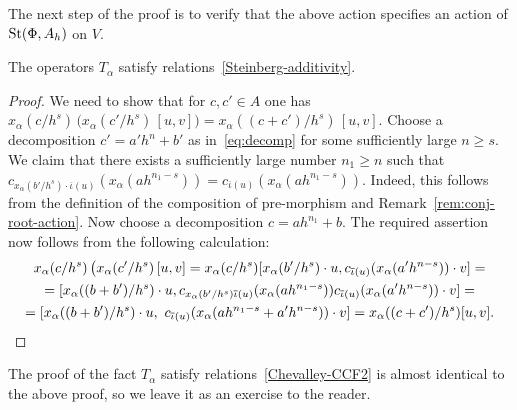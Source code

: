 \documentclass[oneside, 11pt]{amsart} \pdfoutput=1
\begin{document}
The next step of the proof is to verify that the above action specifies an action of $\mathop{\mathrm{St}}\nolimits(\Phi, A_h)$ on $V$.

\begin{lemma} The operators $T_\alpha$ satisfy relations~\eqref{Steinberg-additivity}. \end{lemma}
\begin{proof}
We need to show that for $c, c' \in A$ one has $\textstyle
x_\alpha(c/{h^s})\, \bigl(x_\alpha(c'/h^s)\, [u, v]\bigr) = x_\alpha((c+c')/h^s)\, [u, v].$
Choose a decomposition $c' = a'h^n + b'$ as in~\eqref{eq:decomp} for some sufficiently large $n \geq s$.
We claim that there exists a sufficiently large number $n_1 \geq n$ such that $c_{x_\alpha(b'/h^s) \cdot \overline{\iota}(u)}(x_\alpha(ah^{n_1-s})) = c_{\overline{\iota}(u)}(x_\alpha(ah^{n_1-s}))$. Indeed, this follows from the definition of the composition of pre-morphism and Remark~\ref{rem:conj-root-action}. 
Now choose a decomposition $c = a h^{n_1} + b$.
The required assertion now follows from the following calculation:
\begin{multline*}
 x_\alpha(c/{h^s})\, \bigl(x_\alpha(c'/h^s)\, [u, v] = x_\alpha(c/h^s)[x_\alpha(b'/h^s)\cdot u, c_{\overline{\iota}(u)}(x_\alpha(a'h^{n-s})) \cdot v] = \\
 = [x_\alpha((b + b')/h^s)\cdot u, c_{x_\alpha(b'/h^s)\overline{\iota}(u)}(x_\alpha(ah^{n_1-s})) c_{\overline{\iota}(u)}(x_\alpha(a'h^{n-s})) \cdot v] = \\ = [x_\alpha((b + b')/h^s)\cdot u,\  c_{\overline{\iota}(u)}(x_\alpha(ah^{n_1-s} + a'h^{n-s})) \cdot v] = x_\alpha((c+c')/h^s)[u, v]. \qedhere
\end{multline*}
\end{proof}

The proof of the fact $T_\alpha$ satisfy relations~\eqref{Chevalley-CCF2} is almost identical to the above proof, so we leave it as an exercise to the reader. %
\end{document}
